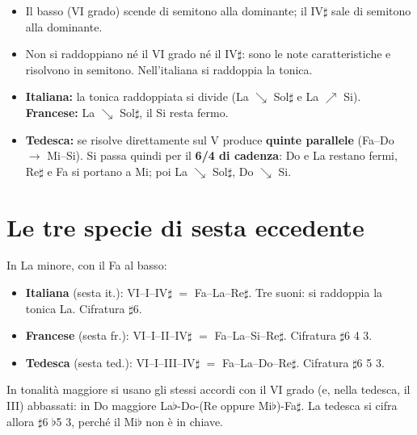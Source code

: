 \begin{regola}
	\label{reg:condotta_seste}
	\begin{itemize}
		\item Il basso (VI grado) scende di semitono alla dominante; il IV$\sharp$ sale di semitono alla dominante.
		\item Non si raddoppiano né il VI grado né il IV$\sharp$: sono le note caratteristiche e risolvono in semitono. Nell'italiana si raddoppia la tonica.
		\item \textbf{Italiana:} la tonica raddoppiata si divide (La $\searrow$ Sol$\sharp$ e La $\nearrow$ Si). \textbf{Francese:} La $\searrow$ Sol$\sharp$, il Si resta fermo.
		\item \textbf{Tedesca:} se risolve direttamente sul V produce \textbf{quinte parallele} (Fa--Do $\rightarrow$ Mi--Si). Si passa quindi per il \textbf{6/4 di cadenza}: Do e La restano fermi, Re$\sharp$ e Fa si portano a Mi; poi La $\searrow$ Sol$\sharp$, Do $\searrow$ Si.
	\end{itemize}
\end{regola}

\section{Le tre specie di sesta eccedente}
\label{sec:tre_specie_seste}

\begin{definizione}
	\label{def:tre_seste}
	In La minore, con il Fa al basso:
	\begin{itemize}
		\item \textbf{Italiana} (sesta it.): VI--I--IV$\sharp$ $=$ Fa--La--Re$\sharp$. Tre suoni: si raddoppia la tonica La. Cifratura $\sharp$6.
		\item \textbf{Francese} (sesta fr.): VI--I--II--IV$\sharp$ $=$ Fa--La--Si--Re$\sharp$. Cifratura $\sharp$6 4 3.
		\item \textbf{Tedesca} (sesta ted.): VI--I--III--IV$\sharp$ $=$ Fa--La--Do--Re$\sharp$. Cifratura $\sharp$6 5 3.
	\end{itemize}
	In tonalità maggiore si usano gli stessi accordi con il VI grado (e, nella tedesca, il III) abbassati: in Do maggiore La$\flat$-Do-(Re oppure Mi$\flat$)-Fa$\sharp$. La tedesca si cifra allora $\sharp$6 $\flat$5 3, perché il Mi$\flat$ non è in chiave.
\end{definizione}

\begin{esempio}
	\label{ex:seste_costruzione_la}
\end{esempio}

